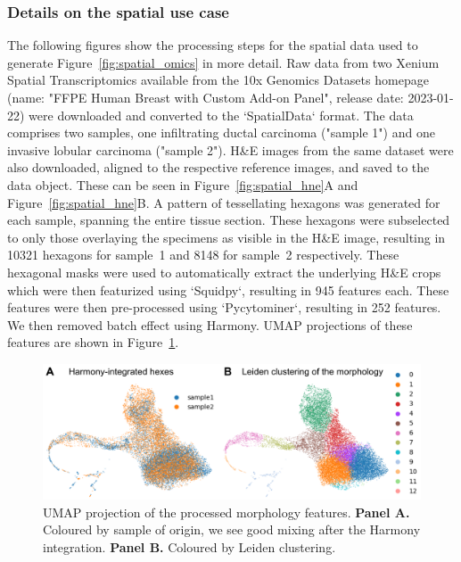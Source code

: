 \documentclass{article}
\begin{document}
\setcounter{section}{5}
\renewcommand{\thesection}{\arabic{section}}
\renewcommand{\thesubsection}{\thesection.\arabic{subsection}}
\renewcommand{\thesubsubsection}{\thesubsection.\arabic{subsubsection}}

\subsubsection{Details on the spatial use case}
\label{sec:spatial_extra}

The following figures show the processing steps for the spatial data used to generate Figure~\ref{fig:spatial_omics} in more detail. Raw data from two Xenium Spatial Transcriptomics available from the 10x Genomics Datasets homepage (name: "FFPE Human Breast with Custom Add-on Panel", release date: 2023-01-22) were downloaded and converted to the `SpatialData` format. The data comprises two samples, one infiltrating ductal carcinoma ("sample 1") and one invasive lobular carcinoma ("sample 2"). H\&E images from the same dataset were also downloaded, aligned to the respective reference images, and saved to the data object. These can be seen in Figure~\ref{fig:spatial_hne}A and Figure~\ref{fig:spatial_hne}B. A pattern of tessellating hexagons was generated for each sample, spanning the entire tissue section. These hexagons were subselected to only those overlaying the specimens as visible in the H\&E image, resulting in 10321 hexagons for sample~1 and 8148 for sample~2 respectively. These hexagonal masks were used to automatically extract the underlying H\&E crops which were then featurized using `Squidpy`, resulting in 945 features each. These features were then pre-processed using `Pycytominer`, resulting in 252 features. We then removed batch effect using Harmony. UMAP projections of these features are shown in Figure~\ref{fig:spatial_umap}.

\begin{figure}[htbp]
\centering
\includegraphics[width=.8\linewidth]{./figs/fig_S1_spatial_umap.png}
\caption{\label{fig:spatial_umap}{}UMAP projection of the processed morphology features. \textbf{Panel A.} Coloured by sample of origin, we see good mixing after the Harmony integration. \textbf{Panel B.} Coloured by Leiden clustering.}
\end{figure}
\end{document}
